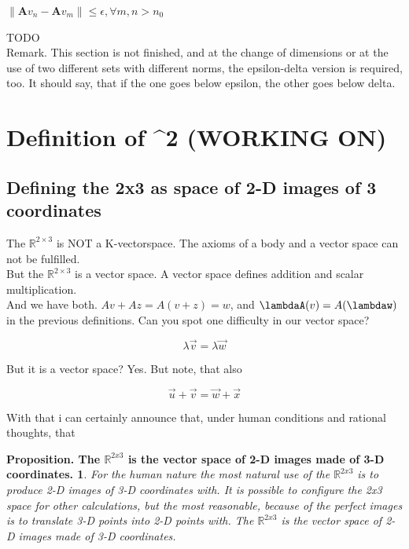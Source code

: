 \documentclass[a4paper]{article}
\begin{document}
\begin{center}
$\|\boldsymbol{A}v_{n} - \boldsymbol{A}v_{m}\| \leq \epsilon,  \forall m,n > n_{0}$
\end{center}

TODO\\

Remark. This section is not finished, and at the change of dimensions or at the use of two different sets with different norms, the epsilon-delta version is required, too. It should say, that if the one goes below epsilon, the other goes below delta.\\


\section{Definition of ^{2} (WORKING ON)}

\subsection{Defining the 2x3 as space of 2-D images of 3 coordinates}

The $\mathbb{R}^{2\times3}$ is NOT a K-vectorspace. The axioms of a body and a vector space can not be fulfilled.\\
But the $\mathbb{R}^{2\times3}$ is a vector space. A vector space defines addition and scalar multiplication.\\
And we have both. $Av + Az = A(v + z) = w$, and $\lambdaA(v) = A(\lambdaw)$ in the previous definitions.
Can you spot one difficulty in our vector space?

\begin{displaymath}
\lambda\vec{v} = \lambda\vec{w}
\end{displaymath}

But it is a vector space? Yes. But note, that also 

\begin{displaymath}
\vec{u} + \vec{v} = \vec{w} + \vec{x}
\end{displaymath}

With that i can certainly announce that, under human conditions and rational thoughts, that

\newtheorem{Proposition}{Proposition. The $\mathbb{R}^{2x3}$ is the vector space of 2-D images made of 3-D coordinates.}
\begin{Proposition}
For the human nature the most natural use of the $\mathbb{R}^{2x3}$ is to produce 2-D images of 3-D coordinates with. It
is possible to configure the 2x3 space for other calculations, but the most reasonable, because of the perfect images is
to translate 3-D points into 2-D points with. The $\mathbb{R}^{2x3}$ is the vector space of 2-D images made of 3-D coordinates.
\end{Proposition}\\
\end{document}
